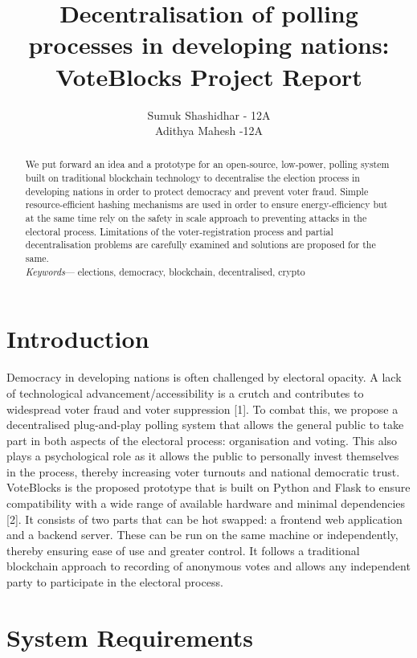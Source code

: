 \documentclass{article}
\title{Decentralisation of polling processes in developing nations: VoteBlocks Project Report}
\author{Sumuk Shashidhar - 12A \\ Adithya Mahesh -12A}
\affil{Sri Kumaran Children's Home}
\begin{document}
    \maketitle
    \begin{abstract}
        We put forward an idea and a prototype for an open-source, low-power, polling system built on traditional blockchain technology to decentralise the election process in developing nations in order to protect democracy and prevent voter fraud. Simple resource-efficient hashing mechanisms are used in order to ensure energy-efficiency but at the same time rely on the safety in scale approach to preventing attacks in the electoral process. Limitations of the voter-registration process and partial decentralisation problems are carefully examined and solutions are proposed for the same. \\

        \textit{Keywords}— elections, democracy, blockchain, decentralised, crypto
    \end{abstract}
    \pagebreak
    
    \tableofcontents
    \pagebreak
    \section{Introduction}
    Democracy in developing nations is often challenged by electoral opacity. A lack of technological advancement/accessibility is a crutch and contributes to widespread voter fraud and voter suppression [1]. To combat this, we propose a decentralised plug-and-play polling system that allows the general public to take part in both aspects of the electoral process: organisation and voting. This also plays a psychological role as it allows the public to personally invest themselves in the process, thereby increasing voter turnouts and national democratic trust.
    VoteBlocks is the proposed prototype that is built on Python and Flask to ensure compatibility with a wide range of available hardware and minimal dependencies [2]. It consists of two parts that can be hot swapped: a frontend web application and a backend server. These can be run on the same machine or independently, thereby ensuring ease of use and greater control. It follows a traditional blockchain approach to recording of anonymous votes and allows any independent party to participate in the electoral process.    
    \section{System Requirements}
\end{document}
